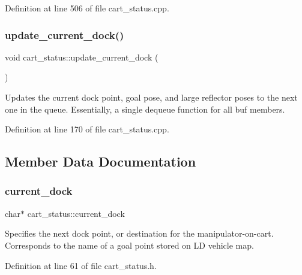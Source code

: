 Definition at line 506 of file cart\+\_\+status.\+cpp.

\mbox{\label{classcart__status_a25c8b8f4c2d8b516284f9cb463f007a8}} 
\subsubsection{\texorpdfstring{update\+\_\+current\+\_\+dock()}{update\_current\_dock()}}
{\footnotesize\ttfamily void cart\+\_\+status\+::update\+\_\+current\+\_\+dock (\begin{DoxyParamCaption}{ }\end{DoxyParamCaption})}

Updates the current dock point, goal pose, and large reflector poses to the next one in the queue. Essentially, a single dequeue function for all buf members. 

Definition at line 170 of file cart\+\_\+status.\+cpp.



\subsection{Member Data Documentation}
\mbox{\label{classcart__status_abee50a181916299e573abd0507fcba47}} 
\subsubsection{\texorpdfstring{current\+\_\+dock}{current\_dock}}
{\footnotesize\ttfamily char$\ast$ cart\+\_\+status\+::current\+\_\+dock\hspace{0.3cm}{\ttfamily [private]}}

Specifies the next dock point, or destination for the manipulator-\/on-\/cart. Corresponds to the name of a goal point stored on LD vehicle map. 

Definition at line 61 of file cart\+\_\+status.\+h.

\mbox{\label{classcart__status_aa6c952cba3af2fd3ad9c67567ecf419d}} 
